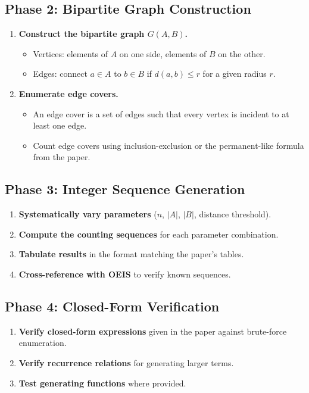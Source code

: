 \documentclass[11pt,a4paper]{article}
\begin{document}
\subsection{Phase 2: Bipartite Graph Construction}
\begin{enumerate}[label=\textbf{2.\arabic*}]
  \item \textbf{Construct the bipartite graph $G(A, B)$.}
    \begin{itemize}
      \item Vertices: elements of $A$ on one side, elements of $B$ on the other.
      \item Edges: connect $a \in A$ to $b \in B$ if $d(a, b) \leq r$ for a given radius $r$.
    \end{itemize}
  \item \textbf{Enumerate edge covers.}
    \begin{itemize}
      \item An edge cover is a set of edges such that every vertex is incident to at least one edge.
      \item Count edge covers using inclusion-exclusion or the permanent-like formula from the paper.
    \end{itemize}
\end{enumerate}

\subsection{Phase 3: Integer Sequence Generation}
\begin{enumerate}[label=\textbf{3.\arabic*}]
  \item \textbf{Systematically vary parameters} ($n$, $|A|$, $|B|$, distance threshold).
  \item \textbf{Compute the counting sequences} for each parameter combination.
  \item \textbf{Tabulate results} in the format matching the paper's tables.
  \item \textbf{Cross-reference with OEIS} to verify known sequences.
\end{enumerate}

\subsection{Phase 4: Closed-Form Verification}
\begin{enumerate}[label=\textbf{4.\arabic*}]
  \item \textbf{Verify closed-form expressions} given in the paper against brute-force enumeration.
  \item \textbf{Verify recurrence relations} for generating larger terms.
  \item \textbf{Test generating functions} where provided.
\end{enumerate}
\end{document}
